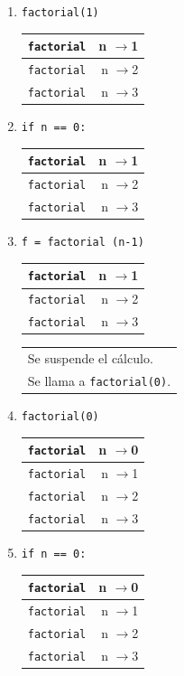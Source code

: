 \begin{enumerate}
\item  \verb|factorial(1)              | 
	\begin{tabular}{r|r|}
	\hline
	\verb|factorial|&n $\rightarrow$1\\
	\hline
	\hline
	\verb|factorial|&n $\rightarrow$2\\
	\hline
	\hline
	\verb|factorial|&n $\rightarrow$3\\
	\hline
	\end{tabular}

\item  \verb|if n == 0:                | 
	\begin{tabular}{r|r|}
	\hline
	\verb|factorial|&n $\rightarrow$1\\
	\hline
	\hline
	\verb|factorial|&n $\rightarrow$2\\
	\hline
	\hline
	\verb|factorial|&n $\rightarrow$3\\
	\hline
	\end{tabular}

\item  \verb|f = factorial (n-1)       | 
	\begin{tabular}{r|r|}
	\hline
	\verb|factorial|&n $\rightarrow$1\\
	\hline
	\hline
	\verb|factorial|&n $\rightarrow$2\\
	\hline
	\hline
	\verb|factorial|&n $\rightarrow$3\\
	\hline
	\end{tabular}
	\begin{tabular}{l}
	Se suspende el cálculo. \\
	Se llama a \verb|factorial(0)|.
	\end{tabular}

\item  \verb|factorial(0)              | 
	\begin{tabular}{r|r|}
	\hline
	\verb|factorial|&n $\rightarrow$0\\
	\hline
	\hline
	\verb|factorial|&n $\rightarrow$1\\
	\hline
	\hline
	\verb|factorial|&n $\rightarrow$2\\
	\hline
	\hline
	\verb|factorial|&n $\rightarrow$3\\
	\hline
	\end{tabular}

\item  \verb|if n == 0:                | 
	\begin{tabular}{r|r|}
	\hline
	\verb|factorial|&n $\rightarrow$0\\
	\hline
	\hline
	\verb|factorial|&n $\rightarrow$1\\
	\hline
	\hline
	\verb|factorial|&n $\rightarrow$2\\
	\hline
	\hline
	\verb|factorial|&n $\rightarrow$3\\
	\hline
	\end{tabular}


\end{enumerate}
